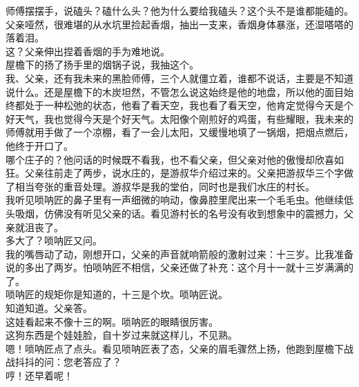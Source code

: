 师傅摆摆手，说磕头？磕什么头？他为什么要给我磕头？这个头不是谁都能磕的。
\\

父亲哑然，很难堪的从水坑里捡起香烟，抽出一支来，香烟身体暴涨，还湿嗒嗒的落着泪。
\\

这？父亲伸出捏着香烟的手为难地说。
\\

屋檐下的扬了扬手里的烟锅子说，我抽这个。
\\

我、父亲，还有我未来的黑脸师傅，三个人就僵立着，谁都不说话，主要是不知道说什么。还是屋檐下的木炭坦然，不管怎么说这始终是他的地盘，所以他的面目始终都处于一种松弛的状态，他看了看天空，我也看了看天空，他肯定觉得今天是个好天气，我也觉得今天是个好天气。太阳像个刚煎好的鸡蛋，有些耀眼，我未来的师傅就用手做了一个凉棚，看了一会儿太阳，又缓慢地填了一锅烟，把烟点燃后，他终于开口了。
\\

哪个庄子的？他问话的时候既不看我，也不看父亲，但父亲对他的傲慢却欣喜如狂。父亲往前走了两步，说水庄的，是游叔华介绍过来的。父亲把游叔华三个字做了相当夸张的重音处理。游叔华是我的堂伯，同时也是我们水庄的村长。
\\

我听见唢呐匠的鼻子里有一声细微的响动，像鼻腔里爬出来一个毛毛虫。他继续低头吸烟，仿佛没有听见父亲的话。看见游村长的名号没有收到想象中的震撼力，父亲就沮丧了。
\\

多大了？唢呐匠又问。
\\

我的嘴唇动了动，刚想开口，父亲的声音就响箭般的激射过来：十三岁。比我准备说的多出了两岁。怕唢呐匠不相信，父亲还做了补充：这个月十一就十三岁满满的了。
\\

唢呐匠的规矩你是知道的，十三是个坎。唢呐匠说。
\\

知道知道。父亲答。
\\

这娃看起来不像十三的啊。唢呐匠的眼睛很厉害。
\\

这狗东西是个娃娃脸，自十岁过来就这样儿，不见熟。
\\

嗯！唢呐匠点了点头。看见唢呐匠表了态，父亲的眉毛骤然上扬，他跑到屋檐下战战抖抖的问：您老答应了？
\\

哼！还早着呢！
\\

